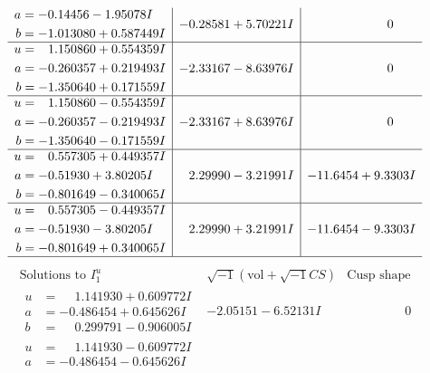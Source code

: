 \documentclass[1p]{elsarticle_modified}
\theoremstyle{definition}
\newcommand{\I}{\sqrt{-1}}
\begin{document}
$$\begin{array}{c|c|c}
\begin{aligned}
a &= -0.14456 - 1.95078 I \\
b &= -1.013080 + 0.587449 I\end{aligned}
 & -0.28581 + 5.70221 I & \phantom{-0.000000 } 0 \\ \hline\begin{aligned}
u &= \phantom{-}1.150860 + 0.554359 I \\
a &= -0.260357 + 0.219493 I \\
b &= -1.350640 + 0.171559 I\end{aligned}
 & -2.33167 - 8.63976 I & \phantom{-0.000000 } 0 \\ \hline\begin{aligned}
u &= \phantom{-}1.150860 - 0.554359 I \\
a &= -0.260357 - 0.219493 I \\
b &= -1.350640 - 0.171559 I\end{aligned}
 & -2.33167 + 8.63976 I & \phantom{-0.000000 } 0 \\ \hline\begin{aligned}
u &= \phantom{-}0.557305 + 0.449357 I \\
a &= -0.51930 + 3.80205 I \\
b &= -0.801649 - 0.340065 I\end{aligned}
 & \phantom{-}2.29990 - 3.21991 I & -11.6454 + 9.3303 I \\ \hline\begin{aligned}
u &= \phantom{-}0.557305 - 0.449357 I \\
a &= -0.51930 - 3.80205 I \\
b &= -0.801649 + 0.340065 I\end{aligned}
 & \phantom{-}2.29990 + 3.21991 I & -11.6454 - 9.3303 I\\
 \hline 
 \end{array}$$\newpage$$\begin{array}{c|c|c}  
\text{Solutions to }I^u_{1}& \I (\text{vol} + \sqrt{-1}CS) & \text{Cusp shape}\\
 \hline 
\begin{aligned}
u &= \phantom{-}1.141930 + 0.609772 I \\
a &= -0.486454 + 0.645626 I \\
b &= \phantom{-}0.299791 - 0.906005 I\end{aligned}
 & -2.05151 - 6.52131 I & \phantom{-0.000000 } 0 \\ \hline\begin{aligned}
u &= \phantom{-}1.141930 - 0.609772 I \\
a &= -0.486454 - 0.645626 I \\

\end{aligned}
\end{array}$$
\end{document}
